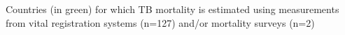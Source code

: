 Countries (in green) for which TB mortality is estimated using measurements from vital registration systems (n=127) and/or mortality surveys (n=2)